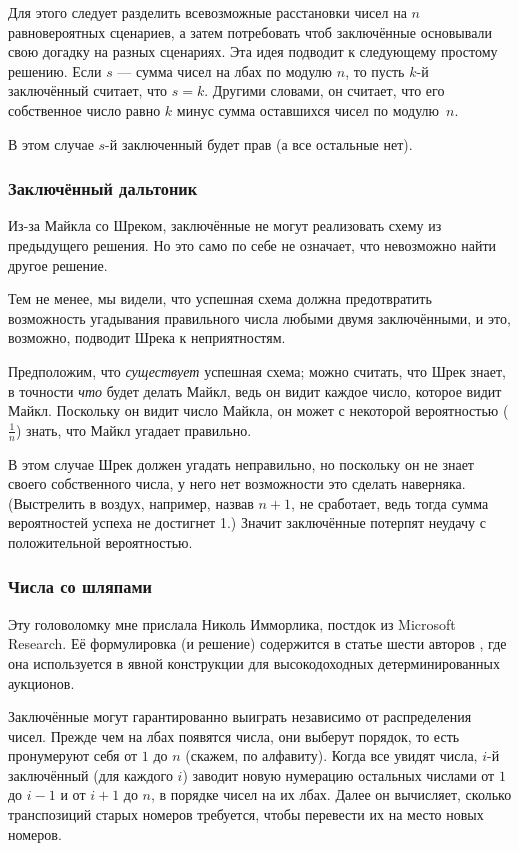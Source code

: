 Для этого следует разделить всевозможные расстановки чисел на $n$ равновероятных сценариев, а затем потребовать чтоб заключённые основывали свою догадку на разных сценариях.
Эта идея подводит к следующему простому решению.
Если $s$ --- сумма чисел на лбах по модулю $n$, то пусть $k$-й заключённый считает, что $s = k$.
Другими словами, он считает, что его собственное число равно $k$ минус сумма оставшихся чисел по модулю~$n$.

В этом случае $s$-й заключенный будет прав (а все остальные нет).

\subsubsection*{Заключённый дальтоник}

Из-за Майкла со Шреком, заключённые не могут реализовать схему из предыдущего решения.
Но это само по себе не означает, что невозможно найти другое решение.

Тем не менее, мы видели, что успешная схема должна предотвратить возможность угадывания правильного числа любыми двумя заключёнными, и это, возможно, подводит Шрека к неприятностям.

Предположим, что \emph{существует} успешная схема; можно считать, что Шрек знает, в точности \emph{что} будет делать Майкл,
ведь он видит каждое число, которое видит Майкл.
Поскольку он видит число Майкла, он может с некоторой вероятностью ($\tfrac1n$) знать, что Майкл угадает правильно.

В этом случае Шрек должен угадать неправильно, но поскольку он не знает своего собственного числа, у него нет возможности это сделать наверняка.
(Выстрелить в воздух, например, назвав $n + 1$, не сработает, ведь тогда сумма вероятностей успеха не достигнет 1.)
Значит заключённые потерпят неудачу с положительной вероятностью.

\subsubsection*{Числа со шляпами}

Эту головоломку мне прислала Николь Имморлика, постдок из Microsoft Research.
Её формулировка (и решение) содержится в статье шести авторов \cite{1}, где она используется в явной конструкции для высокодоходных детерминированных аукционов.

Заключённые могут гарантированно выиграть независимо от распределения чисел.
Прежде чем на лбах появятся числа, они выберут порядок, то есть пронумеруют себя от $1$ до $n$ (скажем, по алфавиту).
Когда все увидят числа, $i$-й заключённый (для каждого $i$) заводит новую нумерацию остальных числами от $1$ до $i - 1$ и от $i + 1$ до $n$, в порядке чисел на их лбах.
Далее он вычисляет, сколько транспозиций старых номеров требуется, чтобы перевести их на место новых номеров.

